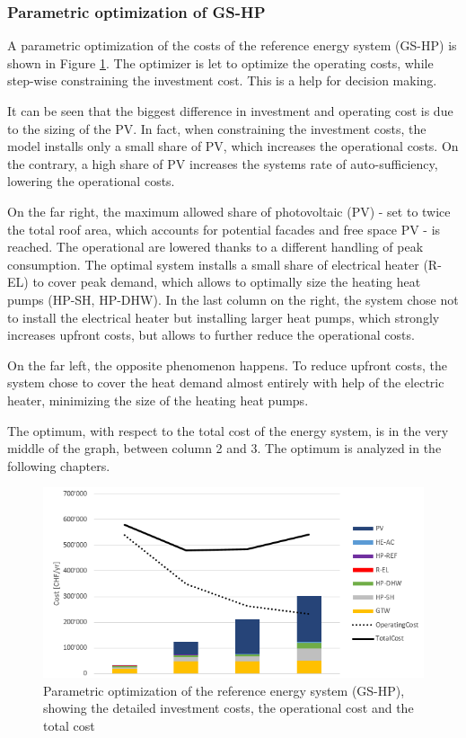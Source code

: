 \documentclass{article}
\begin{document}
\subsubsection{Parametric optimization of GS-HP}
A parametric optimization of the costs of the reference energy system (GS-HP) is shown in Figure \ref{fig:V_G_PO}. The optimizer is let to optimize the operating costs, while step-wise constraining the investment cost. This is a help for decision making.

It can be seen that the biggest difference in investment and operating cost is due to the sizing of the PV. In fact, when constraining the investment costs, the model installs only a small share of PV, which increases the operational costs. On the contrary, a high share of PV increases the systems rate of auto-sufficiency, lowering the operational costs. 

On the far right, the maximum allowed share of photovoltaic (PV) - set to twice the total roof area, which accounts for potential facades and free space PV - is reached. The operational are lowered thanks to a different handling of peak consumption. The optimal system installs a small share of electrical heater (R-EL) to cover peak demand, which allows to optimally size the heating heat pumps (HP-SH, HP-DHW). In the last column on the right, the system chose not to install the electrical heater but installing larger heat pumps, which strongly increases upfront costs, but allows to further reduce the operational costs.

On the far left, the opposite phenomenon happens. To reduce upfront costs, the system chose to cover the heat demand almost entirely with help of the electric heater, minimizing the size of the heating heat pumps.

The optimum, with respect to the total cost of the energy system, is in the very middle of the graph, between column 2 and 3. The optimum is analyzed in the following chapters.

\begin{figure}[htp]
	\centering
	\includegraphics[width=1\textwidth]{V_G_PO1.png}
	\caption{Parametric optimization of the reference energy system (GS-HP), showing the detailed investment costs, the operational cost and the total cost}
	\label{fig:V_G_PO}
\end{figure}
\end{document}
